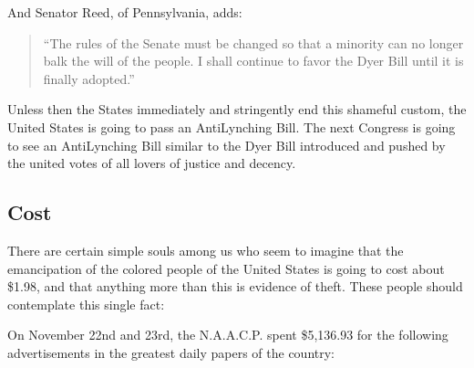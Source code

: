 \documentclass[letterpaper,10pt,english]{jupyterBook}
\begin{document}
\sphinxAtStartPar
And Senator Reed, of Pennsylvania, adds:
\begin{quote}

\sphinxAtStartPar
“The rules of the Senate must be changed so that a minority can no longer balk the will of the people. I shall continue to favor the Dyer Bill until it is finally adopted.”
\end{quote}

\sphinxAtStartPar
Unless then the States immediately and stringently end this shameful custom, the United States is going to pass an Anti\sphinxhyphen{}Lynching Bill. The next Congress is going to see an Anti\sphinxhyphen{}Lynching Bill similar to the Dyer Bill introduced and pushed by the united votes of all lovers of justice and decency.


\subsection{Cost}
\label{\detokenize{Volumes/24/03/intentions:cost}}
\sphinxAtStartPar
There are certain simple souls among us who seem to imagine that the emancipation of the colored people of the United States is going to cost about \$1.98, and that anything more than this is evidence of theft. These people should contemplate this single fact:

\sphinxAtStartPar
On November 22nd and 23rd, the N.A.A.C.P. spent \$5,136.93 for the following advertisements in the greatest daily papers of the country:
\end{document}
